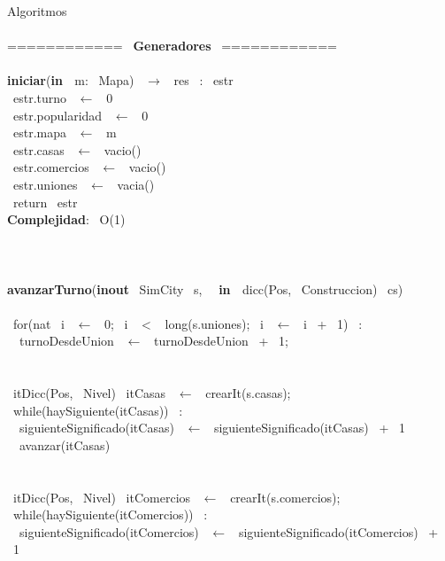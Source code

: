 \noindent Algoritmos
\\
\\============ \ \textbf{Generadores} \ ============ \ 
\\\noindent\makebox[\linewidth]{\rule{\textwidth}{0.4pt}}
\\\textbf{iniciar}(\textbf{in \ }m: \ Mapa) \ $\longrightarrow$ \ res \ : \ estr
\\\indent \ estr.turno \ $\leftarrow$ \ 0
\\\indent \ estr.popularidad \ $\leftarrow$ \ 0
\\\indent \ estr.mapa \ $\leftarrow$ \ m
\\\indent \ estr.casas \ $\leftarrow$ \ vacio()
\\\indent \ estr.comercios \ $\leftarrow$ \ vacio()
\\\indent \ estr.uniones \ $\leftarrow$ \ vacia()
\\\indent \ return \ estr
\\\textbf{Complejidad}: \ O(1)
\\\noindent\makebox[\linewidth]{\rule{\textwidth}{0.4pt}}
\\
\\\noindent\makebox[\linewidth]{\rule{\textwidth}{0.4pt}}
\\\textbf{avanzarTurno}(\textbf{inout} \ SimCity \ s, \  \ \textbf{in \ }dicc(Pos, \ Construccion) \ cs)
\\\indent \ 
\\\indent \ for(nat \ i \ $\leftarrow$ \ 0; \ i \ $<$ \ long(s.uniones); \ i \ $\leftarrow$ \ i \ + \ 1) \ : \ 
\\\indent \ \indent \ turnoDesdeUnion \ $\leftarrow$ \ turnoDesdeUnion \ + \ 1;
\\
\\\indent \ 
\\\indent \ itDicc(Pos, \ Nivel) \ itCasas \ $\leftarrow$ \ crearIt(s.casas);
\\\indent \ while(haySiguiente(itCasas)) \ :
\\\indent \ \indent \ siguienteSignificado(itCasas) \ $\leftarrow$ \ siguienteSignificado(itCasas) \ + \ 1
\\\indent \ \indent \ avanzar(itCasas)
\\
\\\indent \ 
\\\indent \ itDicc(Pos, \ Nivel) \ itComercios \ $\leftarrow$ \ crearIt(s.comercios);
\\\indent \ while(haySiguiente(itComercios)) \ :
\\\indent \ \indent \ siguienteSignificado(itComercios) \ $\leftarrow$ \ siguienteSignificado(itComercios) \ + \ 1

